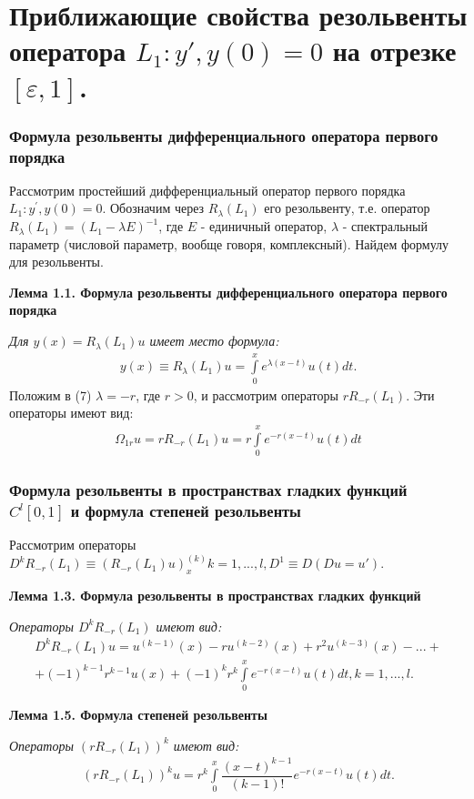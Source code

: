 \documentclass[10pt,utf8,presentation,notheorems]{beamer}
\theoremstyle{plain}
\theoremstyle{definition}
\begin{document}
\section{Приближающие свойства резольвенты оператора $ L_1:y', y(0)=0 $ на отрезке $ [\varepsilon, 1] $.}

\begin{frame}
\frametitle{Формула резольвенты дифференциального оператора первого порядка}
Рассмотрим простейший дифференциальный оператор первого порядка $ L_1:y^{'}, y(0)=0 $. Обозначим через $ R_\lambda(L_1) $ его резольвенту, т.е. оператор $ R_\lambda(L_1)=(L_1-\lambda E)^{-1} $, где $ E $ - единичный оператор, $ \lambda $ - спектральный параметр (числовой параметр,  вообще говоря, комплексный). Найдем формулу для резольвенты.

\label{lemma1.1}
\textbf{Лемма 1.1. Формула резольвенты дифференциального оператора первого порядка}

\textit{Для $ y(x) = R_\lambda(L_1)u$ имеет место формула:}
\begin{equation}
\begin{array}{c}
y(x) \equiv R_\lambda(L_1)u = \int\limits_0^x e^{\lambda(x-t)}u(t)dt.
\end{array}
\end{equation}
Положим в (7) $ \lambda = -r $, где $ r > 0 $, и рассмотрим операторы $ rR_{-r}(L_1)$. Эти операторы имеют вид:
\begin{equation}
\begin{array}{c}
\Omega_{1r}u = rR_{-r}(L_1)u = r \int\limits_0^x e^{-r(x-t)}u(t)dt
\end{array}
\end{equation}
\end{frame}

\begin{frame}
\frametitle{Формула резольвенты в пространствах гладких функций $ C^l[0,1] $ и формула степеней резольвенты}
Рассмотрим операторы $ D^kR_{-r}(L_1) \equiv (R_{-r}(L_1)u)_x^{(k)} k = 1,...,l, D^1 \equiv D (Du = u')$.

\label{lemma1.3}
\textbf{Лемма 1.3. Формула резольвенты в пространствах гладких функций}

\textit{Операторы $ D^kR_{-r}(L_1) $ имеют вид:}
\begin{equation}
\begin{array}{c}
D^kR_{-r}(L_1)u = u^{(k-1)}(x) - ru^{(k-2)}(x) + r^2u^{(k-3)}(x) - ... + \\
+ (-1)^{k-1}r^{k-1}u(x) + (-1)^kr^k\int\limits_0^x e^{-r(x-t)}u(t)dt, k = 1,...,l.
\end{array}
\end{equation}

\label{lemma1.5}
\textbf{Лемма 1.5. Формула степеней резольвенты}

\textit{Операторы $ (rR_{-r}(L_1))^k $ имеют вид:}
\begin{equation}
\begin{array}{c}
(rR_{-r}(L_1))^ku = r^k\int\limits_0^x \dfrac{(x-t)^{k-1}}{(k-1)!}e^{-r(x-t)}u(t)dt.
\end{array}
\end{equation}
\end{frame}
\end{document}
